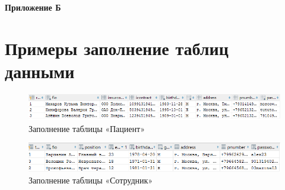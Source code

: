 \documentclass[14pt,a4paper,russian]{extreport}
\begin{document}



\newpage




\newpage





\newpage
\hfill\textbf{Приложение Б}
\setcounter{figure}{0}

\section*{Примеры заполнение таблиц данными}
\setlength{\textfloatsep}{2pt}
\begin{figure}[h!]
        \center\includegraphics[width=\textwidth]{patient}
        \caption{Заполнение таблицы «Пациент»}
        \label{fig:patient}
\end{figure}

\vspace{0.00mm}

\begin{figure}[h!]
        \center\includegraphics[scale=0.83]{employee}
        \caption{Заполнение таблицы «Сотрудник»}
        \label{fig:employee}
\end{figure}
\end{document}
